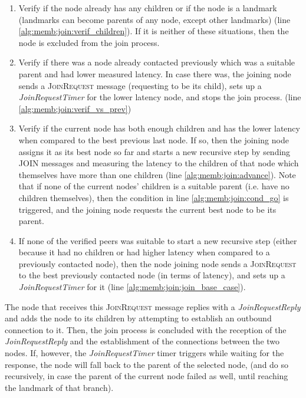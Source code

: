 \begin{enumerate}
    \item Verify if the node already has any children or if the node is a landmark (landmarks can become parents of any node, except other landmarks) (line \ref{alg:memb:join:verif_children}). If it is neither of these situations, then the node is excluded from the join process. 
    
    \item Verify if there was a node already contacted previously which was a suitable parent and had lower measured latency. In case there was, the joining node sends a \textsc{JoinRequest} message (requesting to be its child), sets up a \textit{JoinRequestTimer} for the lower latency node, and stops the join process. (line \ref{alg:memb:join:verif_vs_prev})

    \item Verify if the current node has both enough children and has the lower latency when compared to the best previous last node. If so, then the joining node assigns it as its best node so far and starts a new recursive step by sending JOIN messages and measuring the latency to the children of that node which themselves have more than one children (line \ref{alg:memb:join:advance}). Note that if none of the current nodes' children is a suitable parent (i.e. have no children themselves), then the condition in line \ref{alg:memb:join:cond_go} is triggered, and the joining node requests the current best node to be its parent.
    
    \item If none of the verified peers was suitable to start a new recursive step (either because it had no children or had higher latency when compared to a previously contacted node), then the node joining node sends a \textsc{JoinRequest} to the best previously contacted node (in terms of latency), and sets up a \textit{JoinRequestTimer} for it  (line \ref{alg:memb:join:join_base_case}). 
\end{enumerate}



The node that receives this \textsc{JoinRequest} message replies with a \textit{JoinRequestReply} and adds the node to its children by attempting to establish an outbound connection to it. Then, the join process is concluded with the reception of the \textit{JoinRequestReply} and the establishment of the connections between the two nodes. If, however, the \textit{JoinRequestTimer} timer triggers while waiting for the response, the node will fall back to the parent of the selected node, (and do so recursively, in case the parent of the current node failed as well, until reaching the landmark of that branch).

